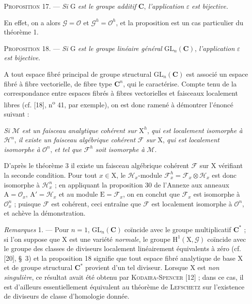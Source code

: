 \textsc{Proposition} 17. --- \textit{Si} $\mathrm{G}$ \textit{est le groupe additif} $\mathbf{C}$, \textit{l'application} $\varepsilon$ \textit{est bijective.}

En effet, on a alors $\mathcal{G} = \mathcal{O}$ et $\mathcal{G}^h = \mathcal{O}^h$, et la proposition est un cas particulier du théorème 1.

\textsc{Proposition} 18. --- \textit{Si} $\mathrm{G}$ \textit{est le groupe linéaire général} $\mathrm{GL}_n(\mathbf{C})$, \textit{l'application} $\varepsilon$ \textit{est bijective.}

A tout espace fibré principal de groupe structural $\mathrm{GL}_n(\mathbf{C})$ est associé un espace fibré à fibre vectorielle, de fibre type $\mathbf{C}^n$, qui le caractérise. Compte tenu de la correspondance entre espaces fibrés à fibres vectorielles et faisceaux localement libres (cf. [18], n\textsuperscript{o} 41, par exemple), on est donc ramené à démontrer l'énoncé suivant :

\textit{Si} $\mathcal{M}$ \textit{est un faisceau analytique cohérent sur} $\mathrm{X}^h$, \textit{qui est localement isomorphe à} $\mathcal{H}^n$, \textit{il existe un faisceau algébrique cohérent} $\mathcal{F}$ \textit{sur} $\mathrm{X}$, \textit{qui est localement isomorphe à} $\mathcal{O}^n$, \textit{et tel que} $\mathcal{F}^h$ \textit{soit isomorphe à} $\mathcal{M}$.



D'après le théorème 3 il existe un faisceau algébrique cohérent $\mathcal{F}$ sur $\mathrm{X}$ vérifiant la seconde condition. Pour tout $x \in \mathrm{X}$, le $\mathcal{H}_x$-module $\mathcal{F}^h_x = \mathcal{F}_x \otimes \mathcal{H}_x$ est donc isomorphe à $\mathcal{H}^n_x$ ; en appliquant la proposition 30 de l'Annexe aux anneaux $\mathrm{A} = \mathcal{O}_x$, $\mathrm{A}' = \mathcal{H}_x$ et au module $\mathrm{E} = \mathcal{F}_x$, on en conclut que $\mathcal{F}_x$ est isomorphe à $\mathcal{O}^n_x$ ; puisque $\mathcal{F}$ est cohérent, ceci entraîne que $\mathcal{F}$ est localement isomorphe à $\mathcal{O}^n$, et achève la démonstration.

\textit{Remarques} 1. --- Pour $n = 1$, $\mathrm{GL}_n(\mathbf{C})$ coïncide avec le groupe multiplicatif $\mathbf{C}^*$ ; si l'on suppose que $\mathrm{X}$ est une variété \textit{normale}, le groupe $\mathrm{H}^1(\mathrm{X}, \mathcal{G})$ coïncide avec le groupe des classes de diviseurs localement linéairement équivalents à zéro (cf. [20], \S\ 3) et la proposition 18 signifie que tout espace fibré analytique de base $\mathrm{X}$ et de groupe structural $\mathbf{C}^*$ provient d'un tel diviseur. Lorsque $\mathrm{X}$ est \textit{non singulière}, ce résultat avait été obtenu par \textsc{Kodaira-Spencer} [12] ; dans ce cas, il est d'ailleurs essentiellement équivalent au théorème de \textsc{Lefschetz} sur l'existence de diviseurs de classe d'homologie donnée.

